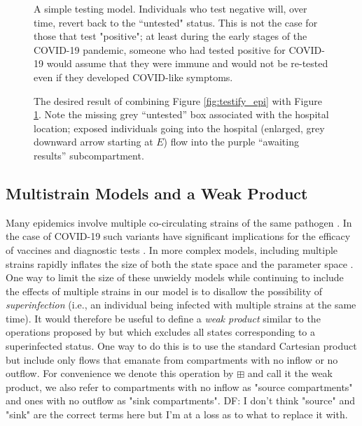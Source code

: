 \documentclass[referee,sn-basic]{sn-jnl}%
\theoremstyle{definition}
\newcommand{\df}[1]{{\color{orange} DF: #1}}
\begin{document}
\begin{figure}
    \centering
    
    \caption{A simple testing model. Individuals who test negative will, over time, revert back to the “untested" status. This is not the case for those that test "positive"; at least during the early stages of the COVID-19 pandemic, someone who had tested positive for COVID-19 would assume that they were immune and would not be re-tested even if they developed COVID-like symptoms.}
    \label{fig:testify_states}
\end{figure}

\begin{figure}
    \centering
    
    \caption{The desired result of combining Figure \ref{fig:testify_epi} with Figure \ref{fig:testify_states}. Note the missing grey ``untested'' box associated with the hospital location; exposed individuals going into the hospital (enlarged, grey downward arrow starting at $E$) flow into the purple ``awaiting results'' subcompartment.}
    \label{fig:testify_desired}
\end{figure}

\FloatBarrier


\subsection{Multistrain Models and a Weak Product}\label{wp}
Many epidemics involve multiple co-circulating strains of the same pathogen \citep{gog2002dynamics, williams2021localization}. In the case of COVID-19 such variants have significant implications for the efficacy of vaccines \citep{abu2021effectiveness, koyama2020emergence} and diagnostic tests \citep{vasireddy2021review}. In more complex models, including multiple strains rapidly inflates the size of both the state space and the parameter space \citep{kryazhimskiy2007state}. One way to limit the size of these unwieldy models while continuing to include the effects of multiple strains in our model is to disallow the possibility of \emph{superinfection} (i.e., an individual being infected with multiple strains at the same time). It would therefore be useful to define a \emph{weak product} similar to the operations proposed by \cite{worden2017products} but which excludes all states corresponding to a superinfected status. One way to do this is to use the standard Cartesian product but include only flows that emanate from compartments with no inflow or no outflow. For convenience we denote this operation by $\boxplus$ and call it the weak product, we also refer to compartments with no inflow as "source compartments" and ones with no outflow as "sink compartments". \df{I don't think "source" and "sink" are the correct terms here but I'm at a loss as to what to replace it with.}
\end{document}
